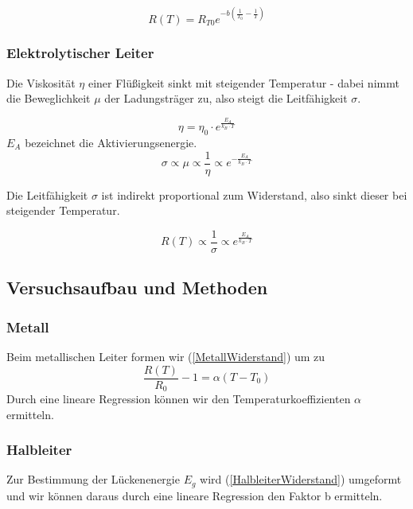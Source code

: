 \documentclass{article}
\begin{document}
\begin{equation}
\label{HalbleiterWiderstand}
R(T)=R_{T0}e^{-b(\frac{1}{T_0}-\frac{1}{T})}
\end{equation}

\subsubsection*{Elektrolytischer Leiter}

Die Viskosität $\eta$ einer Flüßigkeit sinkt mit steigender Temperatur - dabei nimmt die Beweglichkeit $\mu$ der Ladungsträger zu, also steigt die Leitfähigkeit $\sigma$.

\begin{equation}
\label{Viskositaet}
\eta = \eta_0 \cdot e^{\frac{E_A}{k_B \cdot T}}
\end{equation}
$E_A$ bezeichnet die Aktivierungsenergie.
\begin{equation}
\label{LeitfaehigkeitElektrolyt}
\sigma  \propto \mu \propto \frac{1}{\eta} \propto e^{-\frac{E_A}{k_B \cdot T}}
\end{equation}

Die Leitfähigkeit $\sigma$ ist indirekt proportional zum Widerstand, also sinkt dieser bei steigender Temperatur.

\begin{equation}
\label{WiderstandElektrolyt}
R(T) \propto \frac{1}{\sigma} \propto e^{\frac{E_A}{k_B \cdot T}}
\end{equation}

\subsection{Versuchsaufbau und Methoden}
\subsubsection*{Metall}
Beim metallischen Leiter formen wir (\ref{MetallWiderstand}) um zu 
\begin{equation}
\label{alpha-metall}
\frac{R(T)}{R_0}-1=\alpha(T-T_0)
\end{equation}
Durch eine lineare Regression können wir den Temperaturkoeffizienten $\alpha$ ermitteln.
\subsubsection*{Halbleiter}
Zur Bestimmung der Lückenenergie $E_g$ wird (\ref{HalbleiterWiderstand}) umgeformt und wir können daraus durch eine lineare Regression den Faktor b ermitteln.
\end{document}
